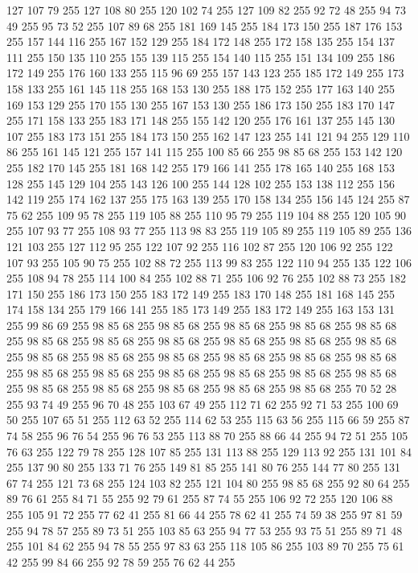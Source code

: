 127 107 79 255 127 108 80 255 120 102 74 255 127 109 82 255 92 72 48 255 94 73 49 255 95 73 52 255 107 89 68 255 181 169 145 255 184 173 150 255 187 176 153 255 157 144 116 255 167 152 129 255 184 172 148 255 172 158 135 255 154 137 111 255 150 135 110 255 155 139 115 255 154 140 115 255 151 134 109 255 186 172 149 255 176 160 133 255 115 96 69 255 157 143 123 255 185 172 149 255 173 158 133 255 161 145 118 255 168 153 130 255 188 175 152 255 177 163 140 255 169 153 129 255 170 155 130 255 167 153 130 255 186 173 150 255 183 170 147 255 171 158 133 255 183 171 148 255 155 142 120 255 176 161 137 255 145 130 107 255 183 173 151 255 184 173 150 255 162 147 123 255 141 121 94 255 129 110 86 255 161 145 121 255 157 141 115 255 100 85 66 255 98 85 68 255 153 142 120 255 182 170 145 255 181 168 142 255 179 166 141 255 178 165 140 255 168 153 128 255 145 129 104 255 143 126 100 255 144 128 102 255 153 138 112 255 156 142 119 255 174 162 137 255 175 163 139 255 170 158 134 255 156 145 124 255
87 75 62 255 109 95 78 255 119 105 88 255 110 95 79 255 119 104 88 255 120 105 90 255 107 93 77 255 108 93 77 255 113 98 83 255 119 105 89 255 119 105 89 255 136 121 103 255 127 112 95 255 122 107 92 255 116 102 87 255 120 106 92 255 122 107 93 255 105 90 75 255 102 88 72 255 113 99 83 255 122 110 94 255 135 122 106 255 108 94 78 255 114 100 84 255 102 88 71 255 106 92 76 255 102 88 73 255 182 171 150 255 186 173 150 255 183 172 149 255 183 170 148 255 181 168 145 255 174 158 134 255 179 166 141 255 185 173 149 255 183 172 149 255 163 153 131 255 99 86 69 255 98 85 68 255 98 85 68 255 98 85 68 255 98 85 68 255 98 85 68 255 98 85 68 255 98 85 68 255 98 85 68 255 98 85 68 255 98 85 68 255 98 85 68 255 98 85 68 255 98 85 68 255 98 85 68 255 98 85 68 255 98 85 68 255 98 85 68 255 98 85 68 255 98 85 68 255 98 85 68 255 98 85 68 255 98 85 68 255 98 85 68 255 98 85 68 255 98 85 68 255 98 85 68 255
98 85 68 255 98 85 68 255 70 52 28 255 93 74 49 255 96 70 48 255 103 67 49 255 112 71 62 255 92 71 53 255 100 69 50 255 107 65 51 255 112 63 52 255 114 62 53 255 115 63 56 255 115 66 59 255 87 74 58 255 96 76 54 255 96 76 53 255 113 88 70 255 88 66 44 255 94 72 51 255 105 76 63 255 122 79 78 255 128 107 85 255 131 113 88 255 129 113 92 255 131 101 84 255 137 90 80 255 133 71 76 255 149 81 85 255 141 80 76 255 144 77 80 255 131 67 74 255 121 73 68 255 124 103 82 255 121 104 80 255 98 85 68 255 92 80 64 255 89 76 61 255 84 71 55 255 92 79 61 255 87 74 55 255 106 92 72 255 120 106 88 255 105 91 72 255 77 62 41 255 81 66 44 255 78 62 41 255 74 59 38 255 97 81 59 255 94 78 57 255 89 73 51 255 103 85 63 255 94 77 53 255 93 75 51 255 89 71 48 255 101 84 62 255 94 78 55 255 97 83 63 255 118 105 86 255 103 89 70 255 75 61 42 255 99 84 66 255 92 78 59 255 76 62 44 255
